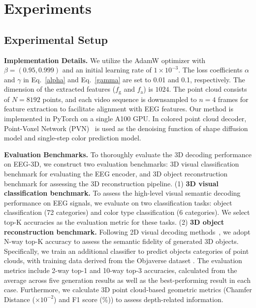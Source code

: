 \section{Experiments}



\subsection{Experimental Setup}

\textbf{Implementation Details.} We utilize the AdamW optimizer \cite{kingma2014adam} with $\beta=(0.95,0.999)$ and an initial learning rate of $1\times 10^{-3}$. The loss coefficients $\alpha$ and $\gamma$ in Eq.~\eqref{alpha} and Eq.~\eqref{gamma} are set to 0.01 and 0.1, respectively. The dimension of the extracted features ($f_\mathrm{g}$ and $f_\mathrm{a}$) is $1024$. The point cloud consists of $N=8192$ points, and each video sequence is downsampled to $n=4$ frames for feature extraction to facilitate alignment with EEG features. Our method is implemented in PyTorch on a single A100 GPU.  In colored point cloud decoder, Point-Voxel Network (PVN)~\cite{liu2019point} is used as the denoising function of shape diffusion model and single-step color prediction model.

\textbf{Evaluation Benchmarks.} To thoroughly evaluate the 3D decoding performance on EEG-3D, we construct two evaluation benchmarks: 3D visual classification benchmark for evaluating the EEG encoder, and 3D object reconstruction benchmark for assessing the 3D reconstruction pipeline.
(1) \textbf{3D visual classification benchmark.} To assess the high-level visual semantic decoding performance on EEG signals,
we evaluate on two classification tasks: object classification (72 categories) and color type classification (6 categories).
We select top-K accuracies as the evaluation metric for these tasks. 
(2) \textbf{3D object reconstruction benchmark.} 
Following 2D visual decoding methods~\cite{li2024visual,chen2024cinematic,chen2023seeing}, we adopt N-way top-K accuracy to assess the semantic fidelity of generated 3D objects.
Specifically, we train an additional classifier to predict objects categories of point clouds, with training data derived from the Objaverse dataset \cite{deitke2023objaverse, xu2023pointllm}.
The evaluation metrics include 2-way top-1 and 10-way top-3 accuracies, calculated from the average across five generation results as well as the best-performing result in each case. 
Furthermore, we calculate 3D point cloud-based geometric metrics (Chamfer Distance ($\times 10^{-2}$) and F1 score ($\%$)) to assess depth-related information.

